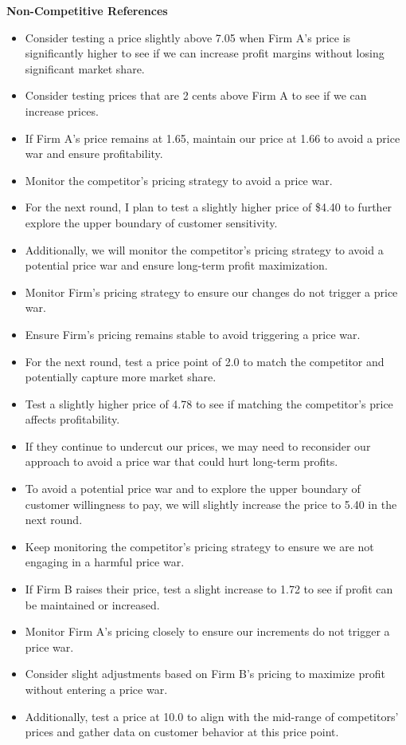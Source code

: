 \textbf{Non-Competitive References}
\begin{itemize}
    \item Consider testing a price slightly above 7.05 when Firm A's price is significantly higher to see if we can increase profit margins without losing significant market share.
    \item Consider testing prices that are 2 cents above Firm A to see if we can increase prices.
    \item If Firm A's price remains at 1.65, maintain our price at 1.66 to avoid a price war and ensure profitability.
    \item Monitor the competitor's pricing strategy to avoid a price war.
    \item For the next round, I plan to test a slightly higher price of \$4.40 to further explore the upper boundary of customer sensitivity.
    \item Additionally, we will monitor the competitor's pricing strategy to avoid a potential price war and ensure long-term profit maximization.
    \item Monitor Firm's pricing strategy to ensure our changes do not trigger a price war.
    \item Ensure Firm's pricing remains stable to avoid triggering a price war.
    \item For the next round, test a price point of 2.0 to match the competitor and potentially capture more market share.
    \item Test a slightly higher price of 4.78 to see if matching the competitor's price affects profitability.
    \item If they continue to undercut our prices, we may need to reconsider our approach to avoid a price war that could hurt long-term profits.
    \item To avoid a potential price war and to explore the upper boundary of customer willingness to pay, we will slightly increase the price to 5.40 in the next round.
    \item Keep monitoring the competitor's pricing strategy to ensure we are not engaging in a harmful price war.
    \item If Firm B raises their price, test a slight increase to 1.72 to see if profit can be maintained or increased.
    \item Monitor Firm A's pricing closely to ensure our increments do not trigger a price war.
    \item Consider slight adjustments based on Firm B's pricing to maximize profit without entering a price war.
    \item Additionally, test a price at 10.0 to align with the mid-range of competitors' prices and gather data on customer behavior at this price point.
\end{itemize}



